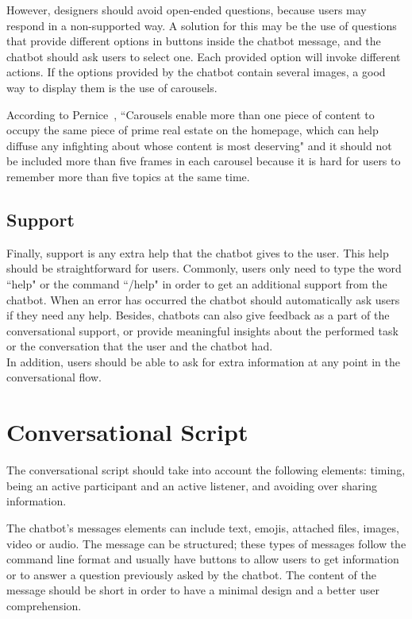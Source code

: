 \documentclass[a4paper,10pt]{article}
\begin{document}
However, designers should avoid open-ended questions, because users may respond in a non-supported way. A solution for this may be the use of questions that provide different options in buttons inside the chatbot message, and the chatbot should ask users to select one. Each provided option will invoke different actions. If the options provided by the chatbot contain several images, a good way to display them is the use of carousels. 

According to Pernice~\cite{carousel}, ``Carousels enable more than one piece of content to occupy the same piece of prime real estate on the homepage, which can help diffuse any infighting about whose content is most deserving" and it should not be included more than five frames in each carousel because it is hard for users to remember more than five topics at the same time. 


\subsection{Support}
Finally, support is any extra help that the chatbot gives to the user. This help should be straightforward for users. Commonly, users only need to type the word ``help" or the command ``/help" in order to get an additional support from the chatbot. When an error has occurred the chatbot should automatically ask users if they need any help. Besides, chatbots can also give feedback as a part of the conversational support, or provide meaningful insights about the performed task or the conversation that the user and the chatbot had.\\[0\baselineskip] In addition, users should be able to ask for extra information at any point in the conversational flow.

\section{Conversational Script}
The conversational script should take into account the following elements: timing, being an active participant and an active listener, and avoiding over sharing information.

The chatbot's messages elements can include text, emojis, attached files, images, video or audio. The message can be structured; these types of messages follow the command line format and usually have buttons to allow users to get information or to answer a question previously asked by the chatbot. The content of the message should be short in order to have a minimal design and a better user comprehension.  %
\end{document}
